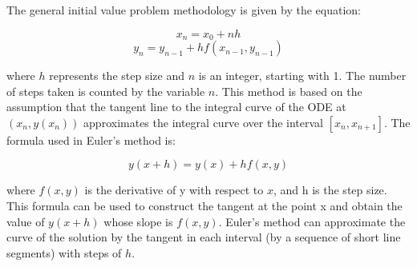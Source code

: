 The general initial value problem methodology is given by the equation: 

\begin{equation}
    x_n = x_0 + nh
\end{equation}
\begin{equation}
    y_n = y_{n-1} + hf(x_{n-1}, y_{n-1})
\end{equation}

where $h$ represents the step size and $n$ is an integer, starting with 1. The number of steps taken is counted by the variable $n$. This method is based on the assumption that the tangent line to the integral curve of the ODE at $(x_n, y(x_n))$ approximates the integral curve over the interval $[x_n, x_{n + 1}]$. The formula used in Euler's method is:

\begin{equation}
    y(x+h) = y(x) + hf(x,y)
\end{equation}

where $f(x,y)$ is the derivative of y with respect to $x$, and h is the step size. This formula can be used to construct the tangent at the point x and obtain the value of $y(x+h)$ whose slope is $f(x,y)$. Euler's method can approximate the curve of the solution by the tangent in each interval (by a sequence of short line segments) with steps of $h$. 






